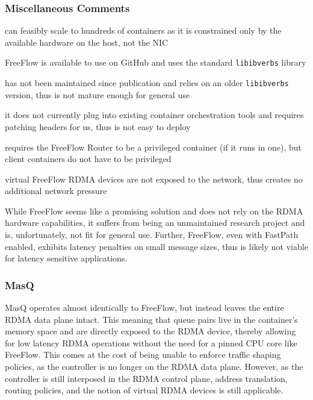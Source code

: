 \documentclass[12pt,titlepage]{article}
\begin{document}
\subsubsection*{Miscellaneous Comments}
\begin{description}[nolistsep,font={{\scshape\bfseries}}]
	\item[Scalability Limits] can feasibly scale to hundreds of containers as it is constrained only by the available hardware on the host, not the NIC
	\item[Proprietary] FreeFlow is available to use on GitHub and uses the standard \texttt{libibverbs} library
	\item[Maturity] has not been maintained since publication and relies on an older \texttt{libibverbs} version, thus is not mature enough for general use
	\item[Ease in Deployment] it does not currently plug into existing container orchestration tools and requires patching headers for us, thus is not easy to deploy
	\item[Execution Privileges] requires the FreeFlow Router to be a privileged container (if it runs in one), but client containers do not have to be privileged
	\item[Network Pressure] virtual FreeFlow RDMA devices are not exposed to the network, thus creates no additional network pressure
\end{description}

While FreeFlow seems like a promising solution and does not rely on the RDMA hardware capabilities, it suffers from being an unmaintained research project and is, unfortunately, not fit for general use.
Further, FreeFlow, even with FastPath enabled, exhibits latency penalties on small message sizes, thus is likely not viable for latency sensitive applications.

\subsubsection{MasQ}
MasQ operates almost identically to FreeFlow, but instead leaves the entire RDMA data plane intact.
This meaning that queue pairs live in the container's memory space and are directly exposed to the RDMA device, thereby allowing for low latency RDMA operations without the need for a pinned CPU core like FreeFlow.
This comes at the cost of being unable to enforce traffic shaping policies, as the controller is no longer on the RDMA data plane.
However, as the controller is still interposed in the RDMA control plane, address translation, routing policies, and the notion of virtual RDMA devices is still applicable.
\end{document}
